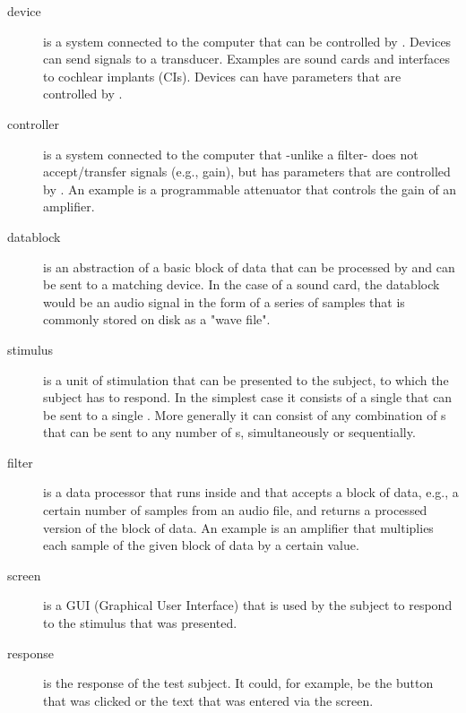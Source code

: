 \begin{description}
 

\item[device] is a system connected to the computer that can be
controlled by \apex. Devices can send signals to a transducer.
Examples are sound cards and interfaces to cochlear implants
(CIs).  Devices can have parameters that are controlled by \apex.

\item[controller] is a system connected to the computer that
-unlike a filter- does not accept/transfer signals (e.g., gain), but
has parameters that are controlled by \apex. An example is a
programmable attenuator that controls the gain of an amplifier. 

\item[datablock] is an abstraction of a basic block of data that
can be processed by \apex and can be sent to a matching device. In
the case of a sound card, the datablock would be an audio signal
in the form of a series of samples that is commonly stored on disk
as a "wave file". \item[stimulus] is a unit of stimulation that
can be presented to the subject, to which the subject has to
respond. In the simplest case it consists of a single
 that can be sent to a single .
More generally it can consist of any combination of
s that can be sent to any number of
s, simultaneously or sequentially.

\item[filter]
is a data processor that runs inside \apex and that accepts a
block of data, e.g., a certain number of samples from an audio
file, and returns a processed version of the block of data. An
example is an amplifier that multiplies each sample of the given
block of data by a certain value.

\item[screen] is a GUI
(Graphical User Interface) that is used by the subject to respond
to the stimulus that was presented.

\item[response] is the
response of the test subject. It could, for example, be the button
that was clicked or the text that was entered via the screen.


\end{description}
